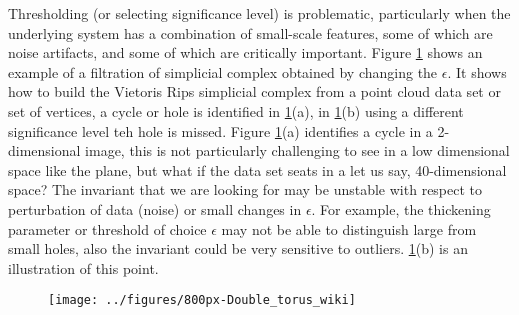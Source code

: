 \documentclass[onecollarge,runningheads]{svjour2}
\begin{document}
Thresholding (or selecting significance level) is problematic, particularly when the underlying system has a combination of small-scale features, some of which are noise artifacts, and some of which are critically important. Figure \ref{fig:whyweneedfiltration} shows an example of a filtration of simplicial complex obtained by changing the $\epsilon$. It shows how to build the Vietoris Rips simplicial complex from a point cloud data set or set of vertices, a cycle or hole is identified in \ref{fig:whyweneedfiltration}(a), in \ref{fig:whyweneedfiltration}(b) using a different significance level teh hole is missed.
Figure \ref{fig:whyweneedfiltration}(a) identifies a cycle in a 2-dimensional image, this is not particularly challenging to see in a low dimensional space like the plane, but what if the data set seats in a let us say, 40-dimensional space?
The invariant that we are looking for may be unstable with respect to perturbation of data (noise) or small changes in $\epsilon$. For example, the thickening parameter or threshold of choice $\epsilon$ may not be able to distinguish large from small holes, also the invariant could be very sensitive to outliers. \ref{fig:whyweneedfiltration}(b) is an illustration of this point.

\begin{figure}[h]
        \centering
        \texttt{[image: ../figures/800px-Double\_torus\_wiki]}
\label{fig:whyweneedfiltration}
\end{figure}
\end{document}

